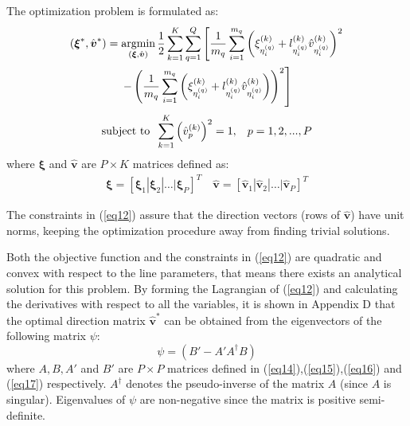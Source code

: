 \documentclass[10pt,journal,cspaper,compsoc]{IEEEtran}
\begin{document}
The optimization problem is formulated as:
\begin{gather}
(\boldsymbol{\xi}^*,\hat{\boldsymbol{v}}^*)=\mathop{\textrm{argmin}}_{(\boldsymbol{\xi},\hat{\boldsymbol{v}})}\frac{1}{2}\sum_{k=1}^{K}\sum_{q=1}^{Q}\left[\frac{1}{m_q}\sum_{i=1}^{m_q}\left(\xi_{\eta_i^{(q)}}^{(k)}+l_{\eta_i^{(q)}}^{(k)}\hat{v}_{\eta_i^{(q)}}^{(k)}\right)^2\right.
\nonumber \\
\left.-\left(\frac{1}{m_q}\sum_{i=1}^{m_q}\left(\xi_{\eta_i^{(q)}}^{(k)}+l_{\eta_i^{(q)}}^{(k)}\hat{v}_{\eta_i^{(q)}}^{(k)}\right)\right)^2\right] \nonumber 
\end{gather}
\begin{equation}
\label{eq12}
\mathop{\textrm{subject to}} \hspace{2mm} \sum_{k=1}^{K}\left(\hat{v}_p^{(k)}\right)^2=1, \hspace{3mm} p=1,2,...,P
\end{equation}
where $\boldsymbol{\xi}$ and $\boldsymbol{\hat{v}}$ are $P\times K$ matrices defined as:
\begin{gather}
\label{eq12_1}
\boldsymbol{\xi} = {\left[\boldsymbol{\xi}_1|\boldsymbol{\xi}_2|\ldots|\boldsymbol{\xi}_P\right]}^T \quad 
\hat{\boldsymbol{v}} = {\left[\hat{\boldsymbol{v}}_1|\hat{\boldsymbol{v}}_2|\ldots|\hat{\boldsymbol{v}}_P\right]}^T
\end{gather}

The constraints in (\ref{eq12}) assure that the direction vectors (rows of $\boldsymbol{\hat{v}}$) have unit norms, keeping the optimization procedure away from finding trivial solutions.

Both the objective function and the constraints in (\ref{eq12}) are quadratic and convex with respect to the line parameters, that means there exists an analytical solution for this problem. By forming the Lagrangian of (\ref{eq12}) and calculating the derivatives with respect to all the variables, it is shown in Appendix D that the optimal direction matrix $\boldsymbol{\hat{v}}^*$ can be obtained from the eigenvectors of the following matrix $\psi$:
\begin{equation}
\label{eq13}
\psi=(B'-A'A^{\dagger}B)
\end{equation}
where $A, B, A'$ and $B'$ are $P\times P$ matrices defined in (\ref{eq14}),(\ref{eq15}),(\ref{eq16}) and (\ref{eq17}) respectively. $A^{\dagger}$ denotes the pseudo-inverse of the matrix $A$ (since $A$ is singular). Eigenvalues of $\psi$ are non-negative since the matrix is positive semi-definite. 
\end{document}
